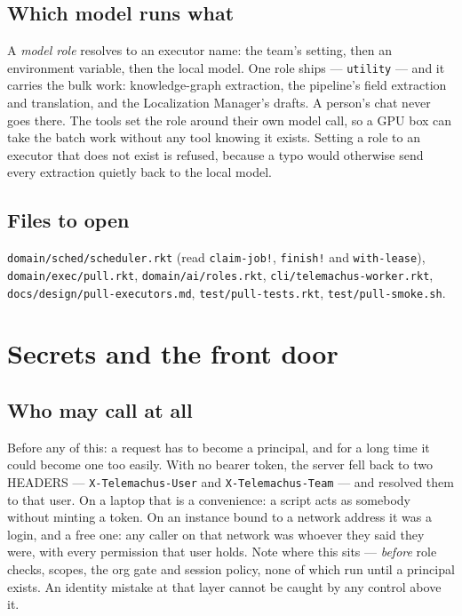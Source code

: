 \documentclass[11pt,a4paper]{report}
\gdef\currentchapterart{art/telemachus-head.png}
\newcommand{\chapterart}[1]{\gdef\currentchapterart{#1}}
\newcommand{\chapterart}[1]{}
\begin{document}
\section{Which model runs what}

A \emph{model role} resolves to an executor name: the team's setting, then an environment variable, then the local model. One role ships --- \texttt{utility} --- and it carries the bulk work: knowledge-graph extraction, the pipeline's field extraction and translation, and the Localization Manager's drafts. A person's chat never goes there. The tools set the role around their own model call, so a GPU box can take the batch work without any tool knowing it exists. Setting a role to an executor that does not exist is refused, because a typo would otherwise send every extraction quietly back to the local model.

\section{Files to open}

\texttt{domain/sched/scheduler.rkt} (read \texttt{claim-job!}, \texttt{finish!} and \texttt{with-lease}), \texttt{domain/exec/pull.rkt}, \texttt{domain/ai/roles.rkt}, \texttt{cli/telemachus-worker.rkt}, \texttt{docs/design/pull-executors.md}, \texttt{test/pull-tests.rkt}, \texttt{test/pull-smoke.sh}.

\chapterart{art/ch-14-secrets.png}
\chapter{Secrets and the front door}

\section{Who may call at all}

Before any of this: a request has to become a principal, and for a long time it could become one too easily. With no bearer token, the server fell back to two HEADERS --- \texttt{X-Telemachus-User} and \texttt{X-Telemachus-Team} --- and resolved them to that user. On a laptop that is a convenience: a script acts as somebody without minting a token. On an instance bound to a network address it was a login, and a free one: any caller on that network was whoever they said they were, with every permission that user holds. Note where this sits --- \emph{before} role checks, scopes, the org gate and session policy, none of which run until a principal exists. An identity mistake at that layer cannot be caught by any control above it.
\end{document}
